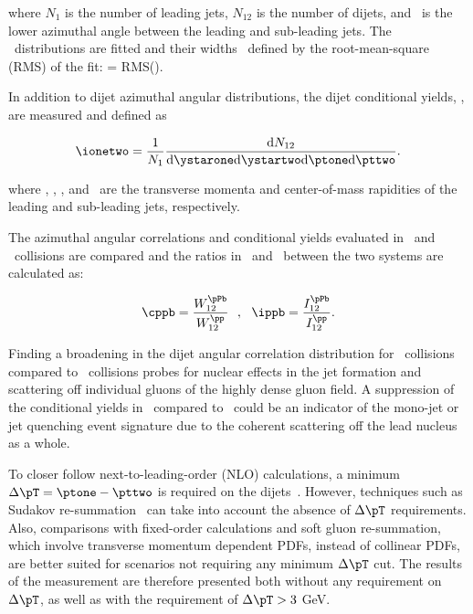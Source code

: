 where $N_{1}$ is the number of leading jets, $N_{12}$ is the number of dijets, and \Dphi\ is the lower azimuthal angle between the leading and sub-leading jets. The \conetwo\ distributions are fitted and their widths \wonetwo\ defined by the root-mean-square (RMS) of the fit: \wonetwo = RMS(\conetwo).

In addition to dijet azimuthal angular distributions, the dijet conditional yields, \ionetwo, are measured and defined as

\begin{equation}
\ionetwo=\frac{1}{N_{1}}  \frac{\mathrm{d}N_{12}}{\mathrm{d}\ystarone\mathrm{d}\ystartwo\mathrm{d}\ptone\mathrm{d}\pttwo}.
\label{eqn:ippb}
\end{equation}

where \ptone, \pttwo, \ystarone, and \ystartwo\ are the transverse momenta and center-of-mass rapidities of the leading and sub-leading jets, respectively. 

The azimuthal angular correlations and conditional yields evaluated in \pPb\ and \pp\ collisions are compared and the ratios in \wonetwo\ and \ionetwo\ between the two systems are calculated as:

\begin{equation}
\cppb=\frac{W_{12}^{\pPb}}{W_{12}^{\pp}} \ \ , \ \ \ippb=\frac{I_{12}^{\pPb}}{I_{12}^{\pp}}.
\end{equation}

Finding a broadening in the dijet angular correlation distribution for \pPb\ collisions compared to \pp\ collisions probes for nuclear effects in the jet formation and scattering off individual gluons of the highly dense gluon field. A suppression of the conditional yields in \pPb\ compared to \pp\ could be an indicator of the mono-jet or jet quenching event signature due to the coherent scattering off the lead nucleus as a whole.

To closer follow next-to-leading-order (NLO) calculations, a minimum $\Delta \pT=\ptone - \pttwo$ is required on the dijets~\cite{Potter:1999gg,Klasen:1995xe,Frixione:1997ks}. However, techniques such as Sudakov re-summation~\cite{Bury:2017jxo} can take into account the absence of $\Delta \pT$ requirements. Also, comparisons with fixed-order calculations and soft gluon re-summation, which involve transverse momentum dependent PDFs, instead of collinear PDFs, are better suited for scenarios not requiring any minimum $\Delta \pT$ cut. The results of the measurement are therefore presented both without any requirement on $\Delta\pT$, as well as with the requirement of $\Delta\pT>3$ GeV.

\FloatBarrier
